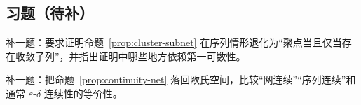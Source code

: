 \subsection*{习题（待补）}

\begin{exercise}[闭包与子网的练习占位]\label{exr:closure-subnet-placeholder}
补一题：要求证明命题~\ref{prop:cluster-subnet} 在序列情形退化为“聚点当且仅当存在收敛子列”，并指出证明中哪些地方依赖第一可数性。
\end{exercise}

\begin{exercise}[弱拓扑桥接题占位]\label{exr:weak-topology-placeholder}
补一题：把命题~\ref{prop:continuity-net} 落回欧氏空间，比较“网连续”“序列连续”和通常 $\varepsilon$-$\delta$ 连续性的等价性。
\end{exercise}
